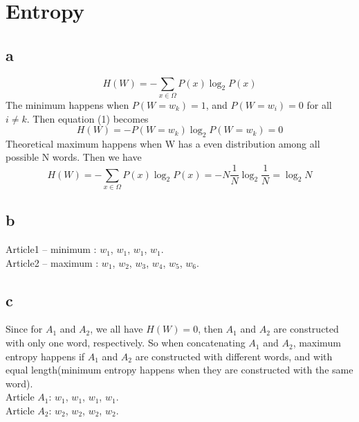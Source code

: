 

\oddsidemargin 0in
\evensidemargin 0in
\textwidth 6.5in
\topmargin -0.5in
\textheight 9.0in




\pagestyle{myheadings}  %

\section{Entropy}
\subsection{a}
\begin{equation}
H(W) = -\sum_{x\in\Omega}P(x)\log_2 P(x)
\end{equation}
The minimum happens when $P(W=w_k)=1$, and $P(W=w_i)=0$ for all $i\neq k$. Then equation (1) becomes
\begin{equation}
H(W) = -P(W=w_k)\log_2 P(W=w_k)=0
\end{equation}
Theoretical maximum happens when W has a even distribution among all possible N words. Then we have
\begin{equation}
H(W) = -\sum_{x\in\Omega}P(x)\log_2 P(x)=-N\frac{1}{N}\log_2 \frac{1}{N}=\log_2 N
\end{equation}

\subsection{b}
Article1 -- minimum : $w_1$, $w_1$, $w_1$, $w_1$.
\\
Article2 -- maximum : $w_1$, $w_2$, $w_3$, $w_4$, $w_5$, $w_6$.

\subsection{c}
Since for $A_1$ and $A_2$, we all have $H(W)=0$, then $A_1$ and $A_2$ are constructed with only one word, respectively. So when concatenating  $A_1$ and $A_2$, maximum entropy happens if $A_1$ and $A_2$ are constructed with different words, and with equal length(minimum entropy happens when they are constructed with the same word). \\
Article $A_1$: $w_1$, $w_1$, $w_1$, $w_1$.\\
Article $A_2$: $w_2$, $w_2$, $w_2$, $w_2$.

